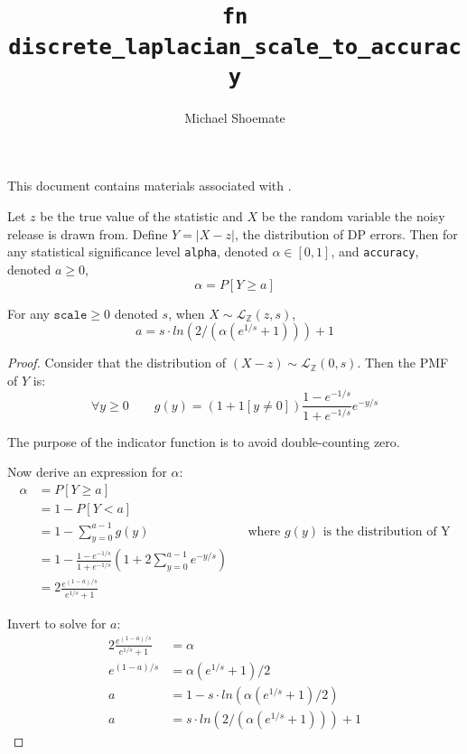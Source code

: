 \documentclass{article}
\title{\texttt{fn discrete\_laplacian\_scale\_to\_accuracy}}
\author{Michael Shoemate}
\begin{document}
\maketitle

This document contains materials associated with .

\begin{definition}
    Let $z$ be the true value of the statistic and $X$ be the random variable the noisy release is drawn from.
    Define $Y = |X - z|$, the distribution of DP errors.
    Then for any statistical significance level \texttt{alpha}, denoted $\alpha \in [0, 1]$, and \texttt{accuracy}, denoted $a \ge 0$,
    \begin{equation}
        \alpha = P[Y \ge a]
    \end{equation}
\end{definition}

\begin{theorem}
    For any $\texttt{scale} \ge 0$ denoted $s$, when $X \sim \mathcal{L}_\mathbb{Z}(z, s)$,
    \begin{equation}
        a = s \cdot ln(2 / (\alpha (e^{1/s} + 1))) + 1
    \end{equation}
\end{theorem}

\begin{proof}

Consider that the distribution of $(X - z) \sim \mathcal{L}_\mathbb{Z}(0, s)$.
Then the PMF of $Y$ is:
\begin{equation}
    \forall y \ge 0 \qquad g(y) = (1 + 1[y \ne 0]) \frac{1 - e^{-1/s}}{1 + e^{-1/s}} e^{-y/s}
\end{equation}

The purpose of the indicator function is to avoid double-counting zero.

Now derive an expression for $\alpha$:
\begin{align*}
    \alpha &= P[Y \ge a] \\
    &= 1 - P[Y < a] \\
    &= 1 - \sum_{y=0}^{a - 1} g(y) && \text{where $g(y)$ is the distribution of Y} \\
    &= 1 - \frac{1 - e^{-1/s}}{1 + e^{-1/s}} \left(1 + 2\sum_{y=0}^{a - 1} e^{-y/s}\right) \\
    &= 2 \frac{e^{(1 - a)/s}}{e^{1/s} + 1}
\end{align*}

Invert to solve for $a$:
\begin{align*}
    2 \frac{e^{(1 - a)/s}}{e^{1/s} + 1} &= \alpha \\
    e^{(1 - a)/s} &= \alpha (e^{1/s} + 1) / 2 \\
    a &= 1 - s \cdot ln(\alpha (e^{1/s} + 1) / 2) \\
    a &= s \cdot ln(2 / (\alpha (e^{1/s} + 1))) + 1
\end{align*}

\end{proof}
\end{document}
